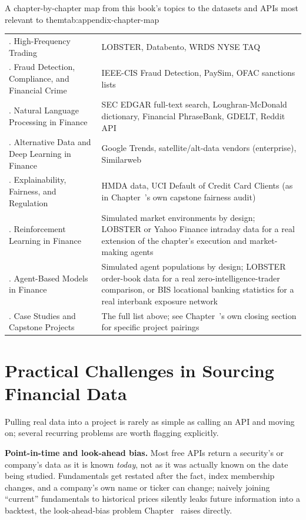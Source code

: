 \documentclass[../ai_in_finance]{subfiles}
\begin{document}
\begin{booktable}[htbp]{A chapter-by-chapter map from this book's topics to the datasets and APIs most relevant to them}{tab:appendix-chapter-map}
\begin{tabular}{L{4.8cm}L{10.6cm}}
. High-Frequency Trading & LOBSTER, Databento, WRDS NYSE TAQ \\
. Fraud Detection, Compliance, and Financial Crime & IEEE-CIS Fraud Detection, PaySim, OFAC sanctions lists \\
. Natural Language Processing in Finance & SEC EDGAR full-text search, Loughran-McDonald dictionary, Financial PhraseBank, GDELT, Reddit API \\
. Alternative Data and Deep Learning in Finance & Google Trends, satellite/alt-data vendors (enterprise), Similarweb \\
. Explainability, Fairness, and Regulation & HMDA data, UCI Default of Credit Card Clients (as in Chapter~'s own capstone fairness audit) \\
. Reinforcement Learning in Finance & Simulated market environments by design; LOBSTER or Yahoo Finance intraday data for a real extension of the chapter's execution and market-making agents \\
. Agent-Based Models in Finance & Simulated agent populations by design; LOBSTER order-book data for a real zero-intelligence-trader comparison, or BIS locational banking statistics for a real interbank exposure network \\
. Case Studies and Capstone Projects & The full list above; see Chapter~'s own closing section for specific project pairings \\
\bottomrule
\end{tabular}
\end{booktable}

\section{Practical Challenges in Sourcing Financial Data}
\label{sec:appendix-challenges}

Pulling real data into a project is rarely as simple as calling an API and moving on; several recurring problems are worth flagging explicitly.

\textbf{Point-in-time and look-ahead bias.} Most free APIs return a security's or company's data as it is known \emph{today}, not as it was actually known on the date being studied. Fundamentals get restated after the fact, index membership changes, and a company's own name or ticker can change; naively joining ``current'' fundamentals to historical prices silently leaks future information into a backtest, the look-ahead-bias problem Chapter~ raises directly.
\end{document}
